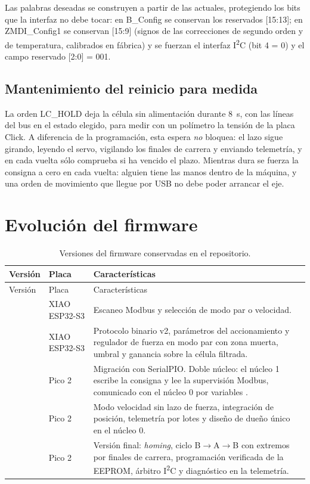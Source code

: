Las palabras deseadas se construyen a partir de las actuales, protegiendo los bits que la interfaz
no debe tocar: en B\_Config se conservan los reservados [15:13]; en ZMDI\_Config1 se conservan
[15:9] (signos de las correcciones de segundo orden y de temperatura, calibrados en fábrica) y se
fuerzan el interfaz I\textsuperscript{2}C (bit 4 = 0) y el campo reservado [2:0] = 001.

\subsection{Mantenimiento del reinicio para medida}

La orden LC\_HOLD deja la célula sin alimentación durante \SI{8}{\second}, con las líneas del bus en
el estado elegido, para medir con un polímetro la tensión de la placa Click. A diferencia de la
programación, esta espera \emph{no} bloquea: el lazo sigue girando, leyendo el servo, vigilando los
finales de carrera y enviando telemetría, y en cada vuelta sólo comprueba si ha vencido el plazo.
Mientras dura se fuerza la consigna a cero en cada vuelta: alguien tiene las manos dentro de la
máquina, y una orden de movimiento que llegue por USB no debe poder arrancar el eje.

\section{Evolución del firmware}

\begin{longtable}{@{}L{0.27\textwidth}L{0.12\textwidth}L{0.49\textwidth}@{}}
\caption{Versiones del firmware conservadas en el repositorio.}\label{tab:versiones-fw}\\
\toprule
Versión & Placa & Características \\
\midrule
\endfirsthead
\toprule
Versión & Placa & Características \\
\midrule
\endhead
{} & XIAO ESP32-S3 & Escaneo Modbus y selección de modo par o velocidad. \\
 & XIAO ESP32-S3 & Protocolo binario v2, parámetros del accionamiento y regulador de fuerza en modo par con zona muerta, umbral y ganancia sobre la célula filtrada. \\
 & Pico 2 & Migración con SerialPIO. Doble núcleo: el núcleo 1 escribe la consigna y lee la supervisión Modbus, comunicado con el núcleo 0 por variables . \\
 & Pico 2 & Modo velocidad sin lazo de fuerza, integración de posición, telemetría por lotes y diseño de dueño único en el núcleo 0. \\
 & Pico 2 & Versión final: \emph{homing}, ciclo B$\rightarrow$A$\rightarrow$B con extremos por finales de carrera, programación verificada de la EEPROM, árbitro I\textsuperscript{2}C y diagnóstico en la telemetría. \\
\bottomrule
\end{longtable}
